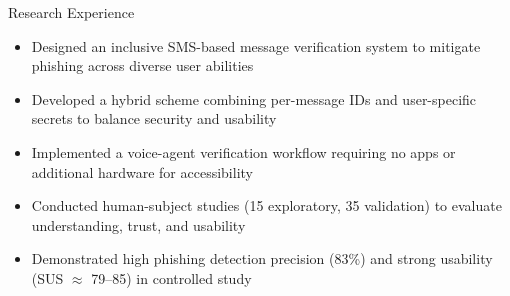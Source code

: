 \documentclass[hidelinks]{resume} %
\begin{document}
\begin{rSection}{R\MakeLowercase{esearch} E\MakeLowercase{xperience}}
\begin{itemize}


\item Designed an inclusive SMS-based message verification system to mitigate phishing across diverse user abilities
\item Developed a hybrid scheme combining per-message IDs and user-specific secrets to balance security and usability
\item Implemented a voice-agent verification workflow requiring no apps or additional hardware for accessibility
\item Conducted human-subject studies (15 exploratory, 35 validation) to evaluate understanding, trust, and usability
\item Demonstrated high phishing detection precision (83\%) and strong usability (SUS $\approx$ 79--85) in controlled study


\end{itemize}

\end{rSection} 
\end{document}
